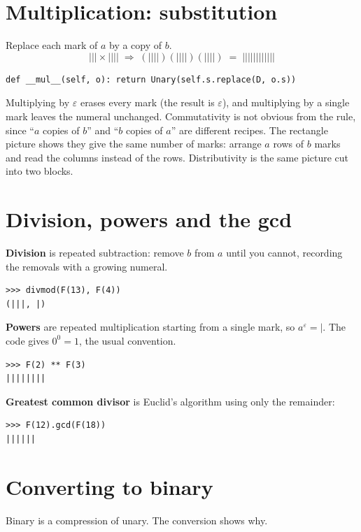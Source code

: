 \documentclass[11pt]{article}
\newcommand{\m}{\texttt{|}}
\begin{document}
\section{Multiplication: substitution}
Replace each mark of $a$ by a copy of $b$.
\[
  \m\m\m \times \m\m\m\m
  \;\Rightarrow\; (\m\m\m\m)(\m\m\m\m)(\m\m\m\m)
  \;=\; \m\m\m\m\m\m\m\m\m\m\m\m
\]
\begin{lstlisting}
def __mul__(self, o): return Unary(self.s.replace(D, o.s))
\end{lstlisting}
Multiplying by $\varepsilon$ erases every mark (the result is $\varepsilon$), and
multiplying by a single mark leaves the numeral unchanged. Commutativity is not
obvious from the rule, since ``$a$ copies of $b$'' and ``$b$ copies of $a$'' are
different recipes. The rectangle picture shows they give the same number of marks:
arrange $a$ rows of $b$ marks and read the columns instead of the rows.
Distributivity is the same picture cut into two blocks.

\section{Division, powers and the gcd}
\textbf{Division} is repeated subtraction: remove $b$ from $a$ until you cannot,
recording the removals with a growing numeral.
\begin{lstlisting}
>>> divmod(F(13), F(4))
(|||, |)
\end{lstlisting}
\textbf{Powers} are repeated multiplication starting from a single mark, so
$a^{\varepsilon}=\m$. The code gives $0^0=1$, the usual convention.
\begin{lstlisting}
>>> F(2) ** F(3)
||||||||
\end{lstlisting}
\textbf{Greatest common divisor} is Euclid's algorithm using only the remainder:
\begin{lstlisting}
>>> F(12).gcd(F(18))
||||||
\end{lstlisting}

\section{Converting to binary}\label{sec:bin}
Binary is a compression of unary. The conversion shows why.
\end{document}
